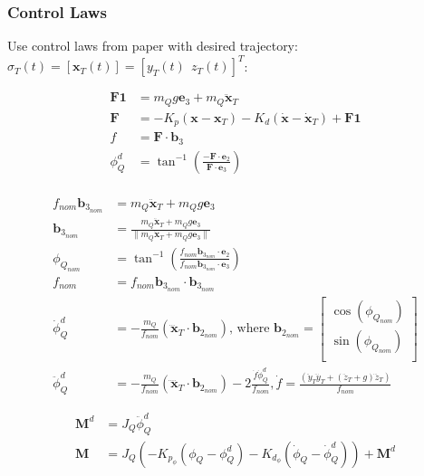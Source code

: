 \documentclass[11pt]{article}
\begin{document}
\newpage
\subsubsection{Control Laws}

Use control laws from paper with desired trajectory: $\sigma_T(t) = [\mathbf{x}_T(t)] = [y_T(t) \ \ z_T(t)]^T$: 

\begin{align*}
\mathbf{F1} &= m_Q g \mathbf{e}_3 + m_Q \mathbf{\ddot{x}}_T \\
\mathbf{F} &= -K_p \left( \mathbf{x} - \mathbf{x}_T \right) - K_d \left(\dot{\mathbf{x}} - \mathbf{\dot{x}}_T \right) + \mathbf{F1} \\
f &= \mathbf{F} \cdot \mathbf{b}_3 \\
\phi_Q^d &= 
\tan^{-1} \left(  
\frac{ - \mathbf{F} \cdot \mathbf{e}_2 } {  \mathbf{F} \cdot \mathbf{e}_3 }
\right) \\
\end{align*} 

\begin{align*}
f_{nom} \mathbf{b}_{3_{nom}} &= m_Q \mathbf{\ddot{x}}_T+  m_Q g \mathbf{e}_3 \\
\mathbf{b}_{3_{nom}} &= \frac{ m_Q \mathbf{\ddot{x}}_T+  m_Q g \mathbf{e}_3 } { \| m_Q \mathbf{\ddot{x}}_T+  m_Q g \mathbf{e}_3 \| } \\
\phi_{Q_{nom}} &= \tan^{-1} \left( \frac{ f_{nom} \mathbf{b}_{3_{nom}} \cdot \mathbf{e}_2 } { f_{nom} \mathbf{b}_{3_{nom}} \cdot \mathbf{e}_3} \right) \\
f_{nom} &= f_{nom} \mathbf{b}_{3_{nom}} \cdot \mathbf{b}_{3_{nom}} \\
\dot{\phi}_Q^d &= - \frac{ m_Q } {f_{nom}} \left( \mathbf{\dddot{x}}_T \cdot \mathbf{b}_{2_{nom}} \right)\text{, where } \mathbf{b}_{2_{nom}} = 
\begin{bmatrix}
       \cos(\phi_{Q_{nom}}) \\
        \sin(\phi_{Q_{nom}}) \\
\end{bmatrix} \\
\ddot{\phi}_Q^d &= - \frac{m_Q}{f_{nom}} (\mathbf{\ddddot{x}}_T \cdot \mathbf{b}_{2_{nom}}) - 2 \frac{ \dot{f} \dot{\phi}_{Q}^d } { f_{nom} }, \dot{f} = \frac{ ( \ddot{y}_T \dddot{y}_T + (\ddot{z}_T + g) \dddot{z}_T ) } { f_{nom} }
\end{align*}

\begin{align*}
\mathbf{M}^d &= J_Q  \ddot{\phi}_Q^d \\ 
\mathbf{M} &= J_Q ( -K_{p_{\phi}} (\phi_Q - \phi_Q^d) - K_{d_{\phi}} (\dot{\phi}_Q - \dot{\phi}_Q^d) ) + \mathbf{M}^d \\
\end{align*}
\end{document}

